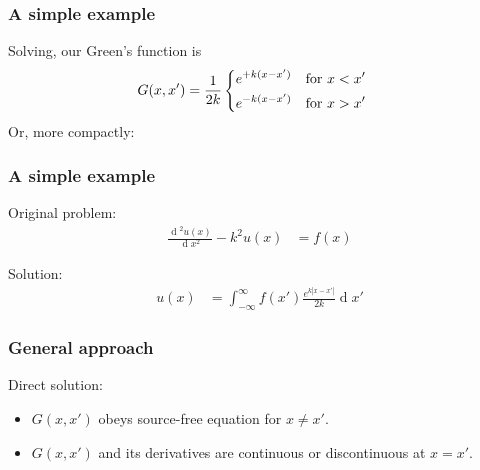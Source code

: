 \documentclass[12 pt, compress, handout, intlimits]{beamer}
\renewcommand{\d}{\operatorname{d}\!}
\newcommand*\widefbox[1]{\fbox{\hspace{1em}#1\hspace{1em}}}
\begin{document}
\begin{frame}[fragile]
    \frametitle{A simple example}
    Solving, our Green's function is
    \begin{align*}
        G(x,x') &= \frac{1}{2k} 
        \begin{dcases} 
            e^{+k (x - x')} & \text{for } x < x'
            \\
            e^{-k (x - x')} & \text{for } x > x'
        \end{dcases}
    \end{align*}
    Or, more compactly:
    

\end{frame}

\note{
}

\begin{frame}[fragile]
    \frametitle{A simple example}

    Original problem:
    \begin{align*}
        \frac{\d^2 u(x)}{\d x^2} - k^2 u(x) &= f(x)
    \end{align*}

    Solution:
    \begin{align*}
        u(x) &= \int_{-\infty}^{\infty} f(x') \frac{e^{k|x - x'|}}{2k} \d x'
    \end{align*}
    
\end{frame}


\begin{frame}[fragile]
    \frametitle{General approach}

    Direct solution:
    \begin{itemize}
    \item
        $ G(x,x') $ obeys source-free equation for $ x \neq x' $.
    \item
        $ G(x,x') $ and its derivatives are continuous or discontinuous at $ x = x' $.
    \end{itemize}
    
\end{frame}
\end{document}
